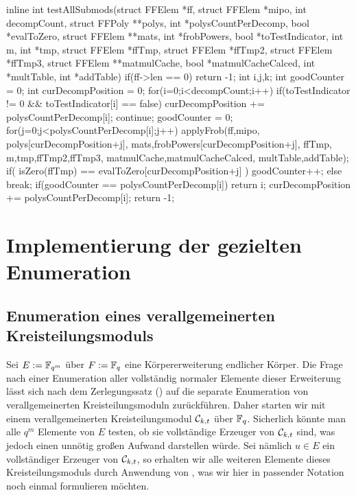 \begin{ccode}[caption={Aus \url{../Sage/enumeratePCNs.c}},
  firstnumber=861, label=lst:testAllSubmods]
inline int testAllSubmods(struct FFElem *ff, struct FFElem *mipo, 
        int decompCount, struct FFPoly **polys,
        int *polysCountPerDecomp, bool *evalToZero, 
        struct FFElem **mats, int *frobPowers, bool *toTestIndicator,
        int m, int *tmp, 
        struct FFElem *ffTmp, struct FFElem *ffTmp2, struct FFElem *ffTmp3,
        struct FFElem **matmulCache, bool *matmulCacheCalced,
        int *multTable, int *addTable){
    if(ff->len == 0) return -1;
    int i,j,k;
    int goodCounter = 0;
    int curDecompPosition = 0;
    for(i=0;i<decompCount;i++){
        if(toTestIndicator != 0 && toTestIndicator[i] == false){
            curDecompPosition += polysCountPerDecomp[i];
            continue;
        }
        goodCounter = 0;
        for(j=0;j<polysCountPerDecomp[i];j++){
            applyFrob(ff,mipo,
                    polys[curDecompPosition+j],
                    mats,frobPowers[curDecompPosition+j], ffTmp,
                    m,tmp,ffTmp2,ffTmp3,
                    matmulCache,matmulCacheCalced,
                    multTable,addTable);
            if( isZero(ffTmp) == evalToZero[curDecompPosition+j] ){
                goodCounter++;
            }else break;
        }
        if(goodCounter == polysCountPerDecomp[i]){
            return i;
        }
        curDecompPosition += polysCountPerDecomp[i];
    }
    return -1;
}
\end{ccode}


\section{Implementierung der gezielten Enumeration}

\subsection{Enumeration eines verallgemeinerten Kreisteilungsmoduls}

Sei $E := \mathbb{F}_{q^m}$ über $F := \mathbb{F}_q$ eine Körpererweiterung endlicher Körper. Die Frage
nach einer Enumeration aller vollständig normaler Elemente dieser Erweiterung
lässt sich nach dem Zerlegungssatz () auf die
separate Enumeration von verallgemeinerten Kreisteilungsmoduln zurückführen.
Daher starten wir mit einem verallgemeinerten Kreisteilungsmodul $\mathcal{C}_{k,t}$
über $\mathbb{F}_q$. Sicherlich könnte man alle $q^m$ Elemente von $E$ testen, ob sie
vollständige Erzeuger von $\mathcal{C}_{k,t}$ sind, was jedoch einen unnötig großen
Aufwand darstellen würde. Sei nämlich $u\in E$ ein vollständiger Erzeuger von
$\mathcal{C}_{k,t}$, so erhalten wir alle weiteren Elemente dieses Kreisteilungsmoduls
durch Anwendung von , was wir hier in passender
Notation noch einmal formulieren möchten.

